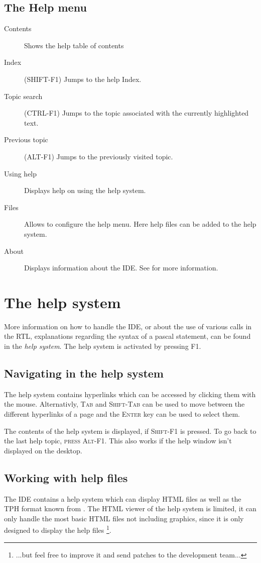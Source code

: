 \subsection{The Help menu}
\label{se:menuhelp}
\begin{description}
\item[Contents]
Shows the help table of contents
\item[Index] (SHIFT-F1)
Jumps to the help Index.
\item[Topic search]  (CTRL-F1)
Jumps to the topic associated with the currently highlighted text.
\item[Previous topic] (ALT-F1)
Jumps to the previously visited topic.
\item[Using help]
Displays help on using the help system.
\item[Files]
Allows to configure the help menu. Here help files can be added to the help
system.
\item[About]
Displays information about the IDE. See  for more information.
\end{description}

\section{The help system}
More information on how to handle the IDE, or about the use of various
calls in the RTL, explanations regarding the syntax of a pascal statement,
can be found in the \emph{help system}. The help system is activated
 by pressing F1.

\subsection{Navigating in the help system}
The help system contains hyperlinks which can be accessed by clicking
them with the mouse. Alternativly, \textsc{Tab} and \textsc{Shift-Tab}
can be used to move between the different hyperlinks of a page
and the \textsc{Enter} key can be used to select them.

The contents of the help system is displayed, if \textsc{Shift-F1} is
pressed. To go back to the last help topic, \textsc{press Alt-F1}. 
This also works if the help window isn't displayed on the desktop.

\subsection{Working with help files}
The IDE contains a help system which can display HTML files
as well as the TPH format known from \tp. The HTML viewer of the 
help system is limited, it can only handle the most basic HTML files 
not including graphics, since it is only designed to display the \fpc help 
files \footnote{...but feel free to improve it and send patches to the 
\fpc development team...}.

